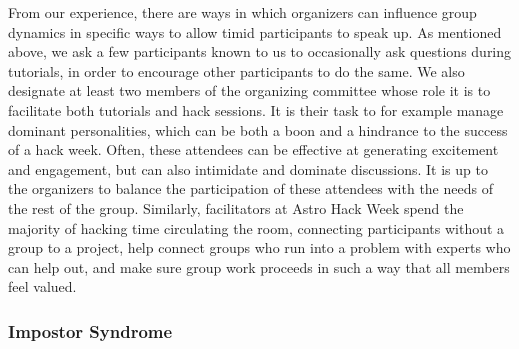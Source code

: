 From our experience, there are ways in which organizers can influence group dynamics in specific ways to allow timid participants to speak up. As mentioned above, we ask a few participants known to us to occasionally ask questions during tutorials, in order to encourage other participants to do the same. We also designate at least two members of the organizing committee whose role it is to facilitate both tutorials and hack sessions. It is their task to for example manage dominant personalities, which can be both a boon and a hindrance to the success of a hack week. Often, these attendees can be effective at generating excitement and engagement, but can also intimidate and dominate discussions. It is up to the organizers to balance the participation of these attendees with the needs of the rest of the group. Similarly, facilitators at Astro Hack Week spend the majority of hacking time circulating the room, connecting participants without a group to a project, help connect groups who run into a problem with experts who can help out, and make sure group work proceeds in such a way that all members feel valued.


\subsubsection{Impostor Syndrome}


